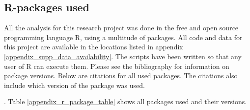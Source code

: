 \documentclass[unnumsec,webpdf,modern,medium]{oup-authoring-template}
\begin{document}
\FloatBarrier

\subsection{R-packages used}
\label{appendix_r_packages}

All the analysis for this research project was done in the free and open source programming language R, using a multitude of packages. All code and data for this project are available in the locations listed in appendix \ref{appendix_supp_data_availability}. The scripts have been written so that any user of R can execute them. Please see the bibliography for information on package versions. Below are citations for all used packages. The citations also include which version of the package was used.

.
\newpage
Table \ref{appendix_r_package_table} shows all packages used and their versions.




\newpage
%

%


\end{document}
